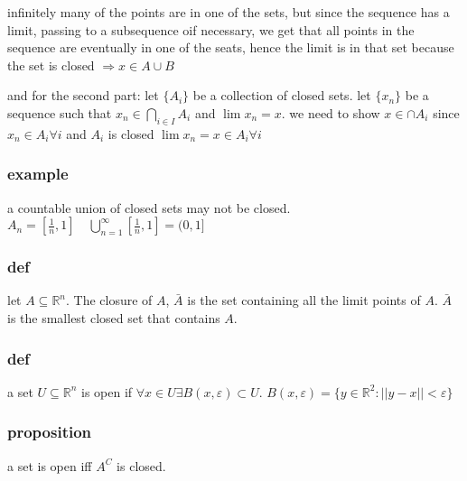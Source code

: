 \documentclass[letterpaper]{article}
\begin{document}
infinitely many of the points are in one of the sets, but since the sequence has a limit, passing to a subsequence oif necessary, we get that all points in the sequence are eventually in one of the seats, hence the limit is in that set because the set is closed $\Rightarrow x\in A\cup B$

and for the second part:
let $\{A_i\}$ be a collection of closed sets. let $\{x_n\}$ be a sequence such that $x_n\in\bigcap_{i\in I}A_i$ and $\lim x_n=x$. we need to show $x\in \cap A_i$ since $x_n\in A_i\forall i$ and $A_i$ is closed $\lim x_n=x\in A_i\forall i$


\subsubsection*{example}
a countable union of closed sets may not be closed. $A_n=[\frac{1}{n},1]\quad \bigcup_{n=1}^\infty[\frac{1}{n},1]=(0,1]$

\subsubsection*{def}
let $A\subseteq\mathbb{R}^n$. The closure of $A$, $\bar{A}$ is the set containing all the limit points of $A$. $\bar{A}$ is the smallest closed set that contains $A$.

\subsubsection*{def}
a set $U\subseteq \mathbb{R}^n$ is open if $\forall x\in U\exists B(x,\varepsilon)\subset U$. $B(x,\varepsilon)=\{y\in \mathbb{R}^2:||y-x||<\varepsilon\}$

\subsubsection*{proposition}
a set is open iff $A^C$ is closed.
\end{document}
